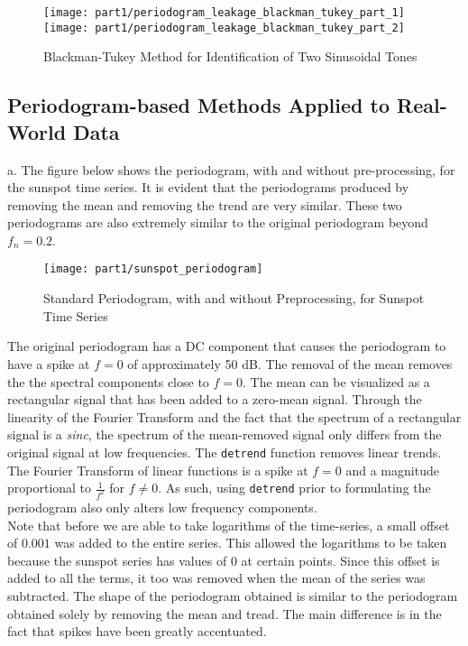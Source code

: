 \begin{figure}[H]
\centering{}
\texttt{[image: part1/periodogram\_leakage\_blackman\_tukey\_part\_1]}
\texttt{[image: part1/periodogram\_leakage\_blackman\_tukey\_part\_2]}
\caption{Blackman-Tukey Method for Identification of Two Sinusoidal Tones}
\end{figure}

\newpage
\subsection{Periodogram-based Methods Applied to Real-World Data}

\noindent{}a. The figure below shows the periodogram, with and without pre-processing, for the sunspot time series. It is evident that the periodograms produced by removing the mean and removing the trend are very similar. These two periodograms are also extremely similar to the original periodogram beyond $f_n=0.2$.

\begin{figure}[H]
\centering{}
\texttt{[image: part1/sunspot\_periodogram]}
\caption{Standard Periodogram, with and without Preprocessing, for Sunspot Time Series}
\end{figure}

\noindent{}The original periodogram has a DC component that causes the periodogram to have a spike at $f=0$ of approximately 50 dB. The removal of the mean removes the the spectral components close to $f=0$. The mean can be visualized as a rectangular signal that has been added to a zero-mean signal. Through the linearity of the Fourier Transform and the fact that the spectrum of a rectangular signal is a \textit{sinc}, the spectrum of the mean-removed signal only differs from the original signal at low frequencies. The \texttt{detrend} function removes linear trends. The Fourier Transform of linear functions is a spike at $f=0$ and a magnitude proportional to $\frac{1}{f^2}$ for $f \neq 0$. As such, using \texttt{detrend} prior to formulating the periodogram also only alters low frequency components. \\

\noindent{}Note that before we are able to take logarithms of the time-series, a small offset of $0.001$ was added to the entire series. This allowed the logarithms to be taken because the sunspot series has values of $0$ at certain points. Since this offset is added to all the terms, it too was removed when the mean of the series was subtracted. The shape of the periodogram obtained is similar to the periodogram obtained solely by removing the mean and tread. The main difference is in the fact that spikes have been greatly accentuated. \\

